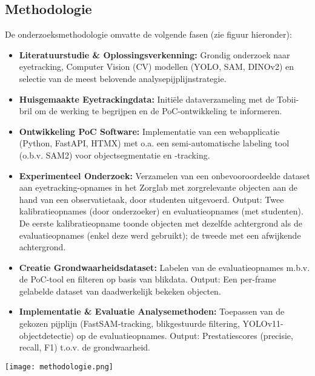 \documentclass[a0,portrait]{hogent-poster}
\begin{document}
\begin{multicols}{2}
\section{Methodologie}
De onderzoeksmethodologie omvatte de volgende fasen (zie figuur hieronder):
\begin{itemize}
  \item \textbf{Literatuurstudie \& Oplossingsverkenning:} Grondig onderzoek naar eyetracking, Computer Vision (CV) modellen (YOLO, SAM, DINOv2) en selectie van de meest belovende analysepijplijnstrategie.
  \item \textbf{Huisgemaakte Eyetrackingdata:} Initiële dataverzameling met de Tobii-bril om de werking te begrijpen en de PoC-ontwikkeling te informeren.
  \item \textbf{Ontwikkeling PoC Software:} Implementatie van een webapplicatie (Python, FastAPI, HTMX) met o.a. een semi-automatische labeling tool (o.b.v. SAM2) voor objectsegmentatie en -tracking.
  \item \textbf{Experimenteel Onderzoek:} Verzamelen van een onbevooroordeelde dataset aan eyetracking-opnames in het Zorglab met zorgrelevante objecten aan de hand van een observatietaak, door studenten uitgevoerd. Output: Twee kalibratieopnames (door onderzoeker) en evaluatieopnames (met studenten). De eerste kalibratieopname toonde objecten met dezelfde achtergrond als de evaluatieopnames (enkel deze werd gebruikt); de tweede met een afwijkende achtergrond.  
  \item \textbf{Creatie Grondwaarheidsdataset:} Labelen van de evaluatieopnames m.b.v. de PoC-tool en filteren op basis van blikdata. Output: Een per-frame gelabelde dataset van daadwerkelijk bekeken objecten.
  \item \textbf{Implementatie \& Evaluatie Analysemethoden:} Toepassen van de gekozen pijplijn (FastSAM-tracking, blikgestuurde filtering, YOLOv11-objectdetectie) op de evaluatieopnames. Output: Prestatiescores (precisie, recall, F1) t.o.v. de grondwaarheid.
\end{itemize}
\vspace{5pt}
\begin{center}
  \captionsetup{type=figure}
  \texttt{[image: methodologie.png]}
\end{center}


\end{multicols}
\end{document}
